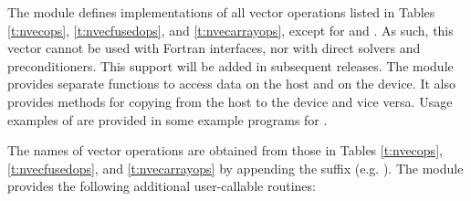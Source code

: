 The {\nveccuda} module defines implementations of all vector operations listed 
in Tables \ref{t:nvecops}, \ref{t:nvecfusedops}, and \ref{t:nvecarrayops}, except
for  and .
As such, this vector cannot be used with {\sundials} Fortran interfaces,
nor with {\sundials} direct solvers and preconditioners. This support
will be added in subsequent {\sundials} releases.
The {\nveccuda} module provides separate functions to access data on the host
and on the device. It also provides methods for copying from the host to 
the device and vice versa. Usage examples of {\nveccuda} are provided in
some example programs for {\cvode} \cite{cvode_ex}.

The names of vector operations are obtained from those in Tables \ref{t:nvecops},
\ref{t:nvecfusedops}, and \ref{t:nvecarrayops} by appending the suffix 
(e.g. ).
The module {\nveccuda}  provides the following additional user-callable routines:

